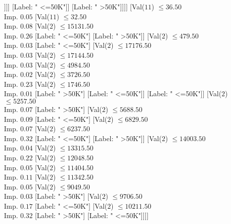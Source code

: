\documentclass[margin=10pt]{standalone}
\begin{document}
\begin{forest}
														[Label: " <=50K"]
														[Label: " >50K"]]]]
											[Label: " <=50K"]]
										[Label: " >50K"]]]]
							[Val($11$) $ \leq 36.50$ \\ Imp. $0.05$
								[Val($11$) $ \leq 32.50$ \\ Imp. $0.08$
									[Val($2$) $ \leq 15131.50$ \\ Imp. $0.26$
										[Label: " <=50K"]
										[Label: " >50K"]]
									[Val($2$) $ \leq 479.50$ \\ Imp. $0.03$
										[Label: " <=50K"]
										[Val($2$) $ \leq 17176.50$ \\ Imp. $0.03$
											[Val($2$) $ \leq 17144.50$ \\ Imp. $0.03$
												[Val($2$) $ \leq 4984.50$ \\ Imp. $0.02$
													[Val($2$) $ \leq 3726.50$ \\ Imp. $0.23$
														[Val($2$) $ \leq 1746.50$ \\ Imp. $0.01$
															[Label: " >50K"]
															[Label: " <=50K"]]
														[Label: " <=50K"]]
													[Val($2$) $ \leq 5257.50$ \\ Imp. $0.07$
														[Label: " >50K"]
														[Val($2$) $ \leq 5688.50$ \\ Imp. $0.09$
															[Label: " <=50K"]
															[Val($2$) $ \leq 6829.50$ \\ Imp. $0.07$
																[Val($2$) $ \leq 6237.50$ \\ Imp. $0.32$
																	[Label: " <=50K"]
																	[Label: " >50K"]]
																[Val($2$) $ \leq 14003.50$ \\ Imp. $0.04$
																	[Val($2$) $ \leq 13315.50$ \\ Imp. $0.22$
																		[Val($2$) $ \leq 12048.50$ \\ Imp. $0.05$
																			[Val($2$) $ \leq 11404.50$ \\ Imp. $0.11$
																				[Val($2$) $ \leq 11342.50$ \\ Imp. $0.05$
																					[Val($2$) $ \leq 9049.50$ \\ Imp. $0.03$
																						[Label: " >50K"]
																						[Val($2$) $ \leq 9706.50$ \\ Imp. $0.17$
																							[Label: " <=50K"]
																							[Val($2$) $ \leq 10211.50$ \\ Imp. $0.32$
																								[Label: " >50K"]
																								[Label: " <=50K"]]]]

\end{forest}
\end{document}
